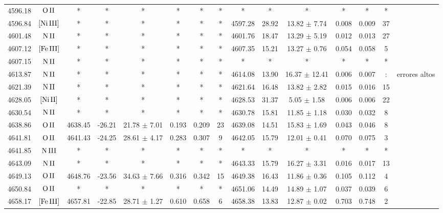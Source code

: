 \documentclass{article}
\begin{document}
\begin{table*}
\begin{adjustbox}{width=\textwidth}
\begin{tabular}{ccccccccccccccc}
4596.18 & $\mbox{O}\thinspace \mbox{II}$ & * & * & * & * & * & * & * & * & * & * & * & * &  \\
4596.84 & $\mbox{[Ni}\thinspace \mbox{III]}$ & * & * & * & * & * & * & 4597.28 & 28.92 & 13.82 $\pm$ 7.74 & 0.008 & 0.009 & 37 &  \\
4601.48 & $\mbox{N}\thinspace \mbox{II}$ & * & * & * & * & * & * & 4601.76 & 18.47 & 13.29 $\pm$ 5.19 & 0.012 & 0.013 & 27 &  \\
4607.12 & $\mbox{[Fe}\thinspace \mbox{III]}$ & * & * & * & * & * & * & 4607.35 & 15.21 & 13.27 $\pm$ 0.76 & 0.054 & 0.058 & 5 &  \\
4607.15 & $\mbox{N}\thinspace \mbox{II}$ & * & * & * & * & * & * & * & * & * & * & * & * &  \\
4613.87 & $\mbox{N}\thinspace \mbox{II}$ & * & * & * & * & * & * & 4614.08 & 13.90 & 16.37 $\pm$ 12.41 & 0.006 & 0.007 & : &  errores altos \\
4621.39 & $\mbox{N}\thinspace \mbox{II}$ & * & * & * & * & * & * & 4621.64 & 16.48 & 13.82 $\pm$ 2.82 & 0.015 & 0.016 & 15 &  \\
4628.05 & $\mbox{[Ni}\thinspace \mbox{II]}$ & * & * & * & * & * & * & 4628.53 & 31.37 & 5.05 $\pm$ 1.58 & 0.006 & 0.006 & 22 &  \\
4630.54 & $\mbox{N}\thinspace \mbox{II}$ & * & * & * & * & * & * & 4630.78 & 15.81 & 11.85 $\pm$ 1.18 & 0.030 & 0.032 & 8 &  \\
4638.86 & $\mbox{O}\thinspace \mbox{II}$ & 4638.45 & -26.21 & 21.78 $\pm$ 7.01 & 0.193 & 0.209 & 23 & 4639.08 & 14.51 & 15.83 $\pm$ 1.69 & 0.043 & 0.046 & 8 &  \\
4641.81 & $\mbox{O}\thinspace \mbox{II}$ & 4641.43 & -24.25 & 28.61 $\pm$ 4.17 & 0.283 & 0.307 & 9 & 4642.05 & 15.79 & 12.01 $\pm$ 0.41 & 0.070 & 0.075 & 3 &  \\
4641.85 & $\mbox{N}\thinspace \mbox{III}$ & * & * & * & * & * & * & * & * & * & * & * & * &  \\
4643.09 & $\mbox{N}\thinspace \mbox{II}$ & * & * & * & * & * & * & 4643.33 & 15.79 & 16.27 $\pm$ 3.31 & 0.016 & 0.017 & 13 &  \\
4649.13 & $\mbox{O}\thinspace \mbox{II}$ & 4648.76 & -23.56 & 34.63 $\pm$ 7.66 & 0.316 & 0.342 & 15 & 4649.38 & 16.43 & 11.86 $\pm$ 0.36 & 0.105 & 0.112 & 4 &  \\
4650.84 & $\mbox{O}\thinspace \mbox{II}$ & * & * & * & * & * & * & 4651.06 & 14.49 & 14.89 $\pm$ 1.07 & 0.037 & 0.039 & 6 &  \\
4658.17 & $\mbox{[Fe}\thinspace \mbox{III]}$ & 4657.81 & -22.85 & 28.71 $\pm$ 1.27 & 0.610 & 0.658 & 6 & 4658.38 & 13.83 & 12.87 $\pm$ 0.02 & 0.703 & 0.748 & 2 &  \\

\end{tabular}
\end{adjustbox}
\end{table*}
\end{document}
